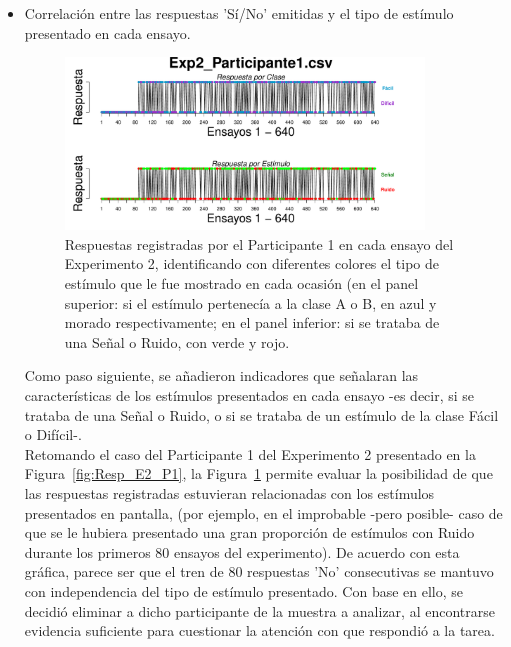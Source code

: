 \begin{itemize}
	\item Correlación entre las respuestas 'Sí/No' emitidas y el tipo de estímulo presentado en cada ensayo.

\begin{figure}[h]
\centering
\includegraphics[width=0.90\textwidth]{Figures/BiasResp_Exp2_P1} 
\decoRule
\caption[Explorando datos individuales (ejemplo): Relación entre la respuesta emitida y el tipo de ensayo]{Respuestas registradas por el Participante 1 en cada ensayo del Experimento 2, identificando con diferentes colores el tipo de estímulo que le fue mostrado en cada ocasión (en el panel superior: si el estímulo pertenecía a la clase A o B, en azul y morado respectivamente; en el panel inferior: si se trataba de una Señal o Ruido, con verde y rojo.}
\label{fig:BiasResp_E1_P1}
\end{figure}

Como paso siguiente, se añadieron indicadores que señalaran las características de los estímulos presentados en cada ensayo -es decir, si se trataba de una Señal o Ruido, o si se trataba de un estímulo de la clase Fácil o Difícil-.\\ 

Retomando el caso del Participante 1 del Experimento 2 presentado en la Figura~\ref{fig:Resp_E2_P1}, la Figura~\ref{fig:BiasResp_E1_P1} permite evaluar la posibilidad de que las respuestas registradas estuvieran relacionadas con los estímulos presentados en pantalla, (por ejemplo, en el improbable -pero posible- caso de que se le hubiera presentado una gran proporción de estímulos con Ruido durante los primeros 80 ensayos del experimento). De acuerdo con esta gráfica, parece ser que el tren de 80 respuestas 'No' consecutivas se mantuvo con independencia del tipo de estímulo presentado. Con base en ello, se decidió eliminar a dicho participante de la muestra a analizar, al encontrarse evidencia suficiente para cuestionar la atención con que respondió a la tarea.\\


\end{itemize}
